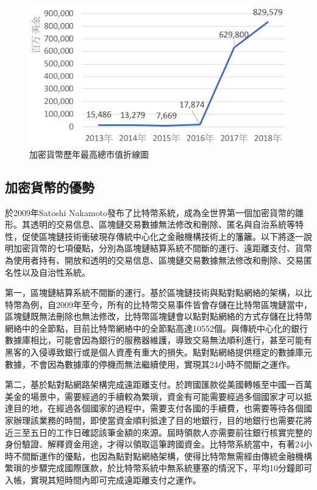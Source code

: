 			\begin{figure}[!htbp]
				\centering
				\includegraphics[width = .6\textwidth]{Thetotalmarketcapitalization.png}
				\caption{加密貨幣歷年最高總市值折線圖\supercite{CryptocurrencyMarketCapitalizations}}\label{Thetotalmarketcapitalization}
			\end{figure}
		

			\subsection{加密貨幣的優勢}
			於2009年Satoshi Nakamoto發布了比特幣系統，成為全世界第一個加密貨幣的雛形。其透明的交易信息、區塊鏈交易數據無法修改和刪除、匿名與⾃治系統等特性，促使區塊鏈技術衝破現存傳統中⼼化之⾦融機構技術上的籓籬。以下將逐一說明加密貨幣的七項優點，分別為區塊鏈結算系統不間斷的運行、遠距離支付、貨幣為使用者持有、開放和透明的交易信息、區塊鏈交易數據無法修改和刪除、交易匿名性以及自治性系統。

				第一，區塊鏈結算系統不間斷的運行。基於區塊鏈技術與點對點網絡的架構，以比特幣為例，自2009年至今，所有的比特幣交易事件皆會存儲在比特幣區塊鏈當中，區塊鏈既無法刪除也無法修改，比特幣區塊鏈會以點對點網絡的方式存儲在比特幣網絡中的全節點\supercite{YouReallyShouldRunaBitcoinFullNode:HeresWhy}，目前比特幣網絡中的全節點高達10552個。與傳統中心化的銀行數據庫相比，可能會因為銀行的服務器維護，導致交易無法順利進行，甚至可能有黑客的入侵導致銀行或是個人資產有重大的損失。點對點網絡提供穩定的數據庫元數據，不會因為數據庫的停機而無法繼續使用，實現其24小時不間斷之運作。
				
				第二，基於點對點網路架構完成遠距離支付。於跨國匯款從美國轉帳至中國一百萬美金的場景中，需要經過的手續較為繁瑣，資金有可能需要經過多個國家才可以抵達目的地，在經過各個國家的過程中，需要支付各國的手續費，也需要等待各個國家辦理該業務的時間，即使當資金順利抵達了目的地銀行，目的地銀行也需要花將近三至五日的工作日確認該筆金額的來源。屆時領款人亦需要前往銀行核實完整的身份驗證、解釋資金用途，才得以領取這筆跨國資金。比特幣系統當中，有著24小時不間斷運作的優點，也因為點對點網絡架構，使得比特幣無需經由傳統金融機構繁瑣的步驟完成國際匯款，於比特幣系統中無系統壅塞的情況下，平均10分鐘即可入帳，實現其短時間內即可完成遠距離支付之運作。

